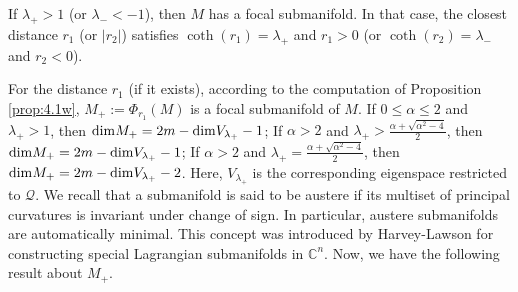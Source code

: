 \documentclass[reqno]{amsart}%
\theoremstyle{definition}
\numberwithin{equation}{section}
\begin{document}
If $\lambda_+>1$ (or $\lambda_-<-1$), then $M$ has a focal submanifold. In that case,
the closest distance $r_1$ (or $|r_2|$) satisfies $\coth(r_1)=\lambda_+$ and $r_1>0$ (or $\coth(r_2)=\lambda_-$ and $r_2<0$). %

For the distance $r_1$ (if it exists), according to the computation of Proposition \ref{prop:4.1w}, $M_+:=\Phi_{r_1}(M)$ is a focal
submanifold of $M$. If $0\leq\alpha\leq2$ and $\lambda_+>1$, then
${\rm dim}M_+=2m-{\rm dim}V_{\lambda_+}-1$;
If $\alpha>2$ and $\lambda_+>\frac{\alpha+\sqrt{\alpha^2-4}}{2}$, then
${\rm dim}M_+=2m-{\rm dim}V_{\lambda_+}-1$; If $\alpha>2$ and $\lambda_+=\frac{\alpha+\sqrt{\alpha^2-4}}{2}$,
then ${\rm dim}M_+=2m-{\rm dim}V_{\lambda_+}-2$.
Here, $V_{\lambda_+}$ is the corresponding eigenspace
restricted to $\mathcal{Q}$.
We recall that a submanifold is said to be austere if its multiset of principal curvatures is invariant under change of sign. In particular, austere submanifolds are automatically minimal.
This concept was introduced by Harvey-Lawson \cite{HL} for constructing special
Lagrangian submanifolds in $\mathbb{C}^n$.
Now, we have the following result about $M_+$.
\end{document}
